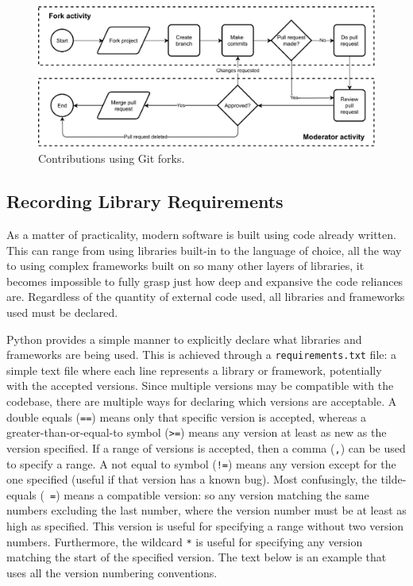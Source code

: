 \documentclass[11pt]{article}
\begin{document}
\begin{figure}[t!]
    \centering
    \includegraphics[width=1.0\textwidth]{figures/git_using_forks.pdf}
    \caption{Contributions using Git forks.}
    \label{fig:git-forks}
\end{figure}

\subsection{Recording Library Requirements}

As a matter of practicality, modern software is built using code already written. This can range from using libraries built-in to the language of choice, all the way to using complex frameworks built on so many other layers of libraries, it becomes impossible to fully grasp just how deep and expansive the code reliances are. Regardless of the quantity of external code used, all libraries and frameworks used must be declared.

Python provides a simple manner to explicitly declare what libraries and frameworks are being used. This is achieved through a \texttt{requirements.txt} file: a simple text file where each line represents a library or framework, potentially with the accepted versions. Since multiple versions may be compatible with the codebase, there are multiple ways for declaring which versions are acceptable. A double equals (\texttt{==}) means only that specific version is accepted, whereas a greater-than-or-equal-to symbol (\texttt{>=}) means any version at least as new as the version specified. If a range of versions is accepted, then a comma (\texttt{,}) can be used to specify a range. A not equal to symbol (\texttt{!=}) means any version except for the one specified (useful if that version has a known bug). Most confusingly, the tilde-equals (\texttt{~=}) means a compatible version: so any version matching the same numbers excluding the last number, where the version number must be at least as high as specified. This version is useful for specifying a range without two version numbers. Furthermore, the wildcard \texttt{*} is useful for specifying any version matching the start of the specified version. The text below is an example that uses all the version numbering conventions.
\end{document}
